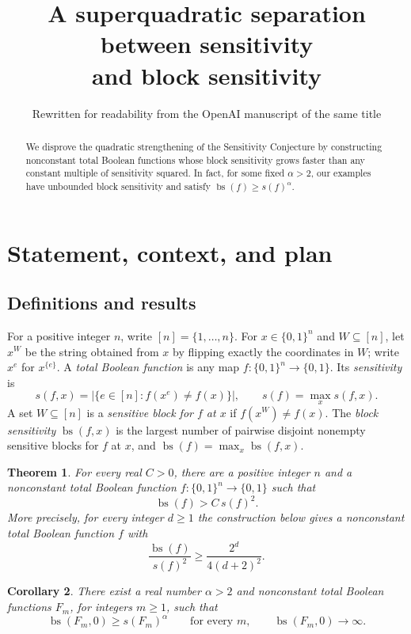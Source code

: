 \documentclass[11pt]{article}
\title{A superquadratic separation between sensitivity\\and block sensitivity}
\author{Rewritten for readability from the OpenAI manuscript of the same title}
\date{}
\newcommand{\bs}{\operatorname{bs}}
\newtheorem{theorem}{Theorem}[section]
\newtheorem{corollary}[theorem]{Corollary}
\theoremstyle{definition}
\theoremstyle{remark}
\begin{document}
\maketitle
\begin{abstract}
We disprove the quadratic strengthening of the Sensitivity Conjecture by
constructing nonconstant total Boolean functions whose block sensitivity grows
faster than any constant multiple of sensitivity squared. In fact, for some
fixed \(\alpha>2\), our examples have unbounded block sensitivity and satisfy
\(\bs(f)\ge s(f)^\alpha\).
\end{abstract}

\section{Statement, context, and plan}
\label{sec:introduction}

\subsection{Definitions and results}

For a positive integer \(n\), write \([n]=\{1,\ldots,n\}\).
For \(x\in\{0,1\}^n\) and \(W\subseteq[n]\), let \(x^W\) be the string obtained from \(x\) by flipping exactly the coordinates in \(W\); write \(x^e\) for \(x^{\{e\}}\).
A \emph{total Boolean function} is any map \(f:\{0,1\}^n\to\{0,1\}\).
Its \emph{sensitivity} is
\[
 s(f,x)=\bigl|\{e\in[n]:f(x^e)\ne f(x)\}\bigr|,
 \qquad s(f)=\max_x s(f,x).
\]
A set \(W\subseteq[n]\) is a \emph{sensitive block for \(f\) at \(x\)} if \(f(x^W)\ne f(x)\).
The \emph{block sensitivity} \(\bs(f,x)\) is the largest number of pairwise disjoint nonempty sensitive blocks for \(f\) at \(x\), and \(\bs(f)=\max_x\bs(f,x)\).

\begin{theorem}\label{thm:main}
For every real \(C>0\), there are a positive integer \(n\) and a
nonconstant total Boolean function \(f:\{0,1\}^n\to\{0,1\}\) such that
\[
 \bs(f)>C\,s(f)^2.
\]
More precisely, for every integer \(d\ge1\) the construction below gives
a nonconstant total Boolean function \(f\) with
\[
 \frac{\bs(f)}{s(f)^2}\ge \frac{2^d}{4(d+2)^2}.
\]
\end{theorem}

\begin{corollary}
\label{cor:power-separation}
There exist a real number $\alpha>2$ and nonconstant total Boolean
functions $F_m$, for integers $m\geq1$, such that
\[
 \bs(F_m,0)\geq s(F_m)^\alpha
 \qquad\text{for every }m,
 \qquad
 \bs(F_m,0)\longrightarrow\infty.
\]
\end{corollary}
\end{document}
